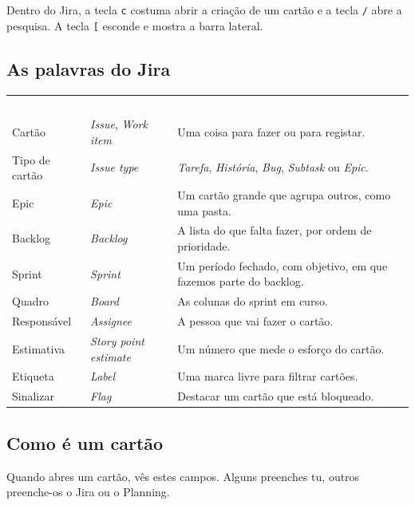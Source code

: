 \documentclass[11pt,a4paper]{article}
\newcommand{\th}[1]{\textcolor{white}{\sffamily\bfseries #1}}
\newcommand{\tabelaini}{\begingroup\small\renewcommand{\arraystretch}{1.45}\rowcolors{2}{azulclaro!55}{white}}
\newcommand{\tabelafim}{\endgroup}
\begin{document}
\begin{tcolorbox}[dica, title={Dica: atalhos de teclado}]
  Dentro do Jira, a tecla \texttt{c} costuma abrir a criação de um cartão e a tecla \texttt{/} abre a pesquisa. A tecla \texttt{[} esconde e mostra a barra lateral.
\end{tcolorbox}

\subsection{As palavras do Jira}

\tabelaini
\begin{tabularx}{\textwidth}{N{2.8cm} L{3.4cm} Y}
   \th{Neste guia} & \th{Em inglês} & \th{O que é} \\
  Cartão & \textit{Issue}, \textit{Work item} & Uma coisa para fazer ou para registar. \\
  Tipo de cartão & \textit{Issue type} & \textit{Tarefa}, \textit{História}, \textit{Bug}, \textit{Subtask} ou \textit{Epic}. \\
  Epic & \textit{Epic} & Um cartão grande que agrupa outros, como uma pasta. \\
  Backlog & \textit{Backlog} & A lista do que falta fazer, por ordem de prioridade. \\
  Sprint & \textit{Sprint} & Um período fechado, com objetivo, em que fazemos parte do backlog. \\
  Quadro & \textit{Board} & As colunas do sprint em curso. \\
  Responsável & \textit{Assignee} & A pessoa que vai fazer o cartão. \\
  Estimativa & \textit{Story point estimate} & Um número que mede o esforço do cartão. \\
  Etiqueta & \textit{Label} & Uma marca livre para filtrar cartões. \\
  Sinalizar & \textit{Flag} & Destacar um cartão que está bloqueado. \\
  \bottomrule
\end{tabularx}
\tabelafim

\subsection{Como é um cartão}

Quando abres um cartão, vês estes campos. Alguns preenches tu, outros preenche-os o Jira ou o Planning.
\end{document}
